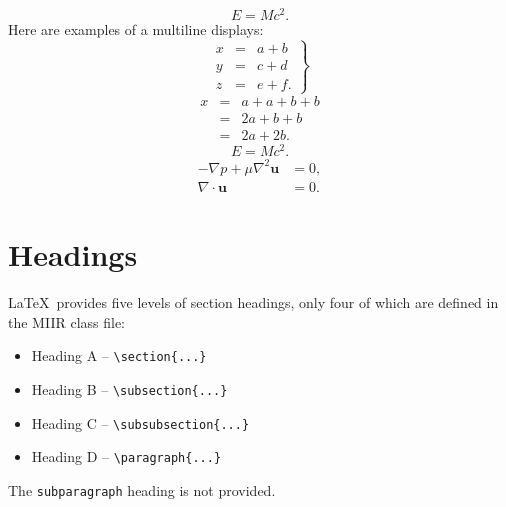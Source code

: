\documentclass{MIIR}
\theoremstyle{plain}
\theoremstyle{definition}
\begin{document}
\begin{equation}\label{einstein}
E = Mc^2 .
\end{equation}
Here are examples of a multiline displays:
\begin{equation}
\left.\begin{array}{rcl}
x &=& a+b\\
y &=& c+d\\
z &=& e+f.
\end{array}\right\}
\end{equation}
\renewcommand{\theequation}{\arabic{equation}}
\setcounter{equation}{0}
\begin{eqnarray}
x&=&a+a+b+b\nonumber\\
&=&2a+b+b\nonumber\\
&=&2a+2b.
\end{eqnarray}
\renewcommand{\theequation}{\thesection.\arabic{equation}}
\setcounter{equation}{0}
\begin{equation}\label{einstein2}
E = Mc^2 .
\end{equation}
\begin{subequations}
\begin{align}
  - \nabla p + \mu\nabla^2\mathbf{u} &= 0 , \label{subeq}\\
  \nabla\cdot\mathbf{u} &= 0. 
\end{align}
\end{subequations}

\section{Headings}

\LaTeX\ provides five levels of section headings, only four of which are
defined in the MIIR class file:
\begin{itemize}
  \item[] Heading A -- \verb"\section{...}"
  \item[] Heading B -- \verb"\subsection{...}"
  \item[] Heading C -- \verb"\subsubsection{...}"
  \item[] Heading D -- \verb"\paragraph{...}"
\end{itemize}
The \verb"subparagraph" heading is not provided.
\end{document}
